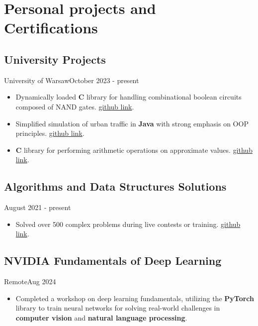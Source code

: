 \section{Personal projects and Certifications}
\subsection{University Projects}{University of Warsaw}{October 2023 - present}
\begin{itemize}
	\item Dynamically loaded \textbf{C} library for handling combinational boolean circuits composed of NAND gates. \href{https://github.com/mrolbiecki/university-projects/tree/main/computer-architecture-and-operating-systems/nand-gates-simulator}{github link}.
	\item Simplified simulation of urban traffic in \textbf{Java} with strong emphasis on OOP principles. \href{https://github.com/mrolbiecki/university-projects/tree/main/object-oriented-programming/public-transport-simulation}{github link}.
	\item \textbf{C} library for performing arithmetic operations on approximate values. \href{https://github.com/mrolbiecki/university-projects/tree/main/introductory-programming/arithmetic-of-approximate-values}{github link}.
\end{itemize}

\subsection{Algorithms and Data Structures Solutions}{}{August 2021 - present}
\begin{itemize}
	\item Solved over 500 complex problems during live contests or training. \href{https://github.com/mrolbiecki/competitive-programming-solutions}{github link}.
\end{itemize}

\subsection{NVIDIA Fundamentals of Deep Learning}{Remote}{Aug 2024}
\begin{itemize}
    \item Completed a workshop on deep learning fundamentals, utilizing the \textbf{PyTorch} library to train neural networks for solving real-world challenges in \textbf{computer vision} and \textbf{natural language processing}.
\end{itemize}

\vspace{1em}
